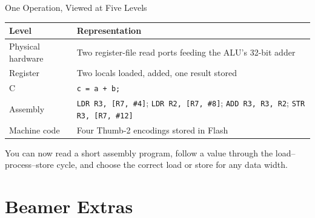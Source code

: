 \documentclass[9pt,aspectratio=169,xcolor=table]{beamer}
\begin{document}
\begin{frame}{One Operation, Viewed at Five Levels}
    \begin{center}
    {\small
    \striped
    \begin{tabular}{@{}l R{.65\textwidth}@{}}
        \toprule
        \textbf{Level} & \textbf{Representation} \\
        \midrule
        Physical hardware & Two register-file read ports feeding the ALU's 32-bit adder \\
        Register          & Two locals loaded, added, one result stored \\
        C                 & \texttt{c = a + b;} \\
        Assembly          & \texttt{LDR R3, [R7, \#4]}; \texttt{LDR R2, [R7, \#8]}; \texttt{ADD R3, R3, R2}; \texttt{STR R3, [R7, \#12]} \\
        Machine code      & Four Thumb-2 encodings stored in Flash \\
        \bottomrule
    \end{tabular}}
    \end{center}

    \vspace{3mm}
    \begin{block}{You can now}
        read a short assembly program, follow a value through the
        load--process--store cycle, and choose the correct load or store
        for any data width.
    \end{block}
\end{frame}


\section{Beamer Extras}

\def\bw{1.0}
\def\rh{0.62}
\def\regx{0.7}
\def\regy{4.3}
\def\memx{5.2}
\def\memy{3.0}

%
%
%
%
\end{document}
